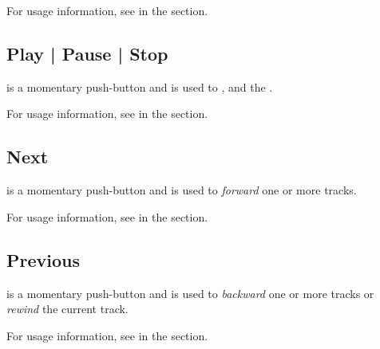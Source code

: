 For usage information, see \hyperref[Audio - Volume]{} in the
\hyperref[Audio]{} section.

\subsection{Play | Pause | Stop} \label{Play|Pause|Stop}

 is a momentary push-button and is used to ,  and
 the .

\par\medskip

For usage information, see \hyperref[Audio - Play|Pause|Stop]{} in the
\hyperref[Audio]{} section.

\subsection{Next} \label{Next}

 is a momentary push-button and is used to  \textit{forward} one
or more tracks.

\par\medskip

For usage information, see \hyperref[Audio - Next]{} in the
\hyperref[Audio]{} section.

\subsection{Previous} \label{Previous}

 is a momentary push-button and is used to  \textit{backward}
one or more tracks or \textit{rewind} the current track.

\par\medskip

For usage information, see \hyperref[Audio - Previous]{} in the
\hyperref[Audio]{} section.

